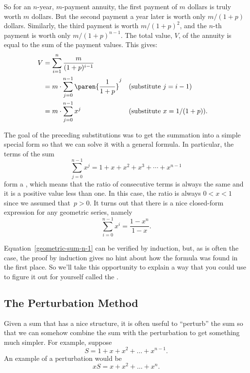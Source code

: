 So for an $n$-year, $m$-payment annuity, the first payment of $m$ dollars
is truly worth $m$ dollars.  But the second payment a year later is worth
only $m/(1+p)$ dollars.  Similarly, the third payment is worth
$m/(1+p)^2$, and the $n$-th payment is worth only $m/(1+p)^{n-1}$.  The
total value, $V$, of the annuity is equal to the sum of the payment
values.  This gives:
\begin{align}
  V & = \sum_{i=1}^n \frac{m}{(1+p)^{i-1}}\notag\\
  & = m \cdot \sum_{j=0}^{n-1} \paren{\frac{1}{1+p}}^j
          && \text{(substitute $j = i-1$)}\notag\\
  & = m \cdot \sum_{j=0}^{n-1} x^j
          && \text{(substitute $x = 1/(1+p)$)}.\label{jn-1xsum}
\end{align}

The goal of the preceding substitutions was to get the summation into
a simple special form so that we can solve it with a general formula.
In particular, the terms of the sum
\begin{equation*}
    \sum_{j = 0}^{n - 1} x^j = 1 + x + x^2 + x^3 + \cdots + x^{n - 1}
\end{equation*}
form a , which means that the ratio of
consecutive terms is always the same and it is a positive value less
than one.  In this case, the ratio is always $0 < x < 1$ since we
assumed that~$p > 0$.  It turns out that there is a nice closed-form
expression for any geometric series, namely
\begin{equation}\label{geometric-sum-n-1}
    \sum_{i = 0}^{n - 1} x^i = \frac{1 - x^n}{1 - x}.
\end{equation}

Equation~\ref{geometric-sum-n-1} can be verified by induction, but, as
is often the case, the proof by induction gives no hint about how the
formula was found in the first place.  So we'll take this opportunity
to explain a way
that you could use to figure it out for yourself called the
.

\subsection{The Perturbation Method}\label{sec:perturbation}

Given a sum that has a nice structure, it is often useful to
``perturb'' the sum so that we can somehow combine the sum with the
perturbation to get something much simpler.  For example, suppose
\begin{equation*}
    S = 1 + x + x^2 + \dots + x^{n - 1}.
\end{equation*}
An example of a perturbation would be
\begin{equation*}
    xS = x + x^2 + \dots + x^n.
\end{equation*}


